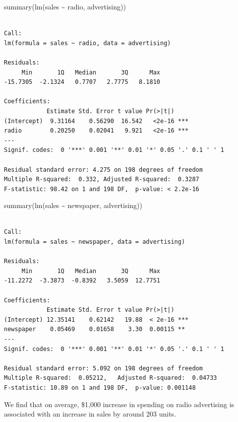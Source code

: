 \documentclass[
  letterpaper,
  DIV=11,
  numbers=noendperiod]{scrreprt}
\newenvironment{Shaded}{\begin{snugshade}}{\end{snugshade}}
\newcommand{\FunctionTok}[1]{\textcolor[rgb]{0.02,0.16,0.49}{#1}}
\newcommand{\NormalTok}[1]{\textcolor[rgb]{0.33,0.33,0.33}{#1}}
\newcommand{\SpecialCharTok}[1]{\textcolor[rgb]{0.00,0.46,0.62}{#1}}
\begin{document}
\begin{Shaded}
\begin{Highlighting}[]
\FunctionTok{summary}\NormalTok{(}\FunctionTok{lm}\NormalTok{(sales }\SpecialCharTok{\textasciitilde{}}\NormalTok{ radio, advertising))}
\end{Highlighting}
\end{Shaded}

\begin{verbatim}

Call:
lm(formula = sales ~ radio, data = advertising)

Residuals:
     Min       1Q   Median       3Q      Max 
-15.7305  -2.1324   0.7707   2.7775   8.1810 

Coefficients:
            Estimate Std. Error t value Pr(>|t|)    
(Intercept)  9.31164    0.56290  16.542   <2e-16 ***
radio        0.20250    0.02041   9.921   <2e-16 ***
---
Signif. codes:  0 '***' 0.001 '**' 0.01 '*' 0.05 '.' 0.1 ' ' 1

Residual standard error: 4.275 on 198 degrees of freedom
Multiple R-squared:  0.332, Adjusted R-squared:  0.3287 
F-statistic: 98.42 on 1 and 198 DF,  p-value: < 2.2e-16
\end{verbatim}

\begin{Shaded}
\begin{Highlighting}[]
\FunctionTok{summary}\NormalTok{(}\FunctionTok{lm}\NormalTok{(sales }\SpecialCharTok{\textasciitilde{}}\NormalTok{ newspaper, advertising))}
\end{Highlighting}
\end{Shaded}

\begin{verbatim}

Call:
lm(formula = sales ~ newspaper, data = advertising)

Residuals:
     Min       1Q   Median       3Q      Max 
-11.2272  -3.3873  -0.8392   3.5059  12.7751 

Coefficients:
            Estimate Std. Error t value Pr(>|t|)    
(Intercept) 12.35141    0.62142   19.88  < 2e-16 ***
newspaper    0.05469    0.01658    3.30  0.00115 ** 
---
Signif. codes:  0 '***' 0.001 '**' 0.01 '*' 0.05 '.' 0.1 ' ' 1

Residual standard error: 5.092 on 198 degrees of freedom
Multiple R-squared:  0.05212,   Adjusted R-squared:  0.04733 
F-statistic: 10.89 on 1 and 198 DF,  p-value: 0.001148
\end{verbatim}

We find that on average, \$1,000 increase in spending on radio
advertising is associated with an increase in sales by around 203 units.
\end{document}
